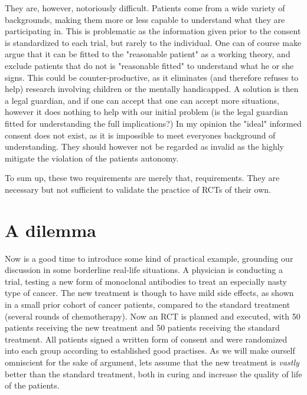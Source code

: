 \documentclass[12p]{article}
\begin{document}
They are, however, notoriously difficult.
Patients come from a wide variety of backgrounds, making them more or less capable to understand what they are participating in.
This is problematic as the information given prior to the consent is standardized to each trial, but rarely to the individual.
One can of course make argue that it can be fitted to the "reasonable patient" as a working theory, and exclude patients that do not is "reasonable fitted" to understand what he or she signs.
This could be counter-productive, as it eliminates (and therefore refuses to help) research involving children or the mentally handicapped.
A solution is then a legal guardian, and if one can accept that one can accept more situations, however it does nothing to help with our initial problem (is the legal guardian fitted for understanding the full implications?)
In my opinion the "ideal" informed consent does not exist, as it is impossible to meet everyones background of understanding.
They should however not be regarded as invalid as the highly mitigate the violation of the patients autonomy.

To sum up, these two requirements are merely that, requirements.
They are necessary but not sufficient to validate the practice of RCTs of their own.

\section*{A dilemma}

Now is a good time to introduce some kind of practical example, grounding our discussion in some borderline real-life situations.
A physician is conducting a trial, testing a new form of monoclonal antibodies to treat an especially nasty type of cancer.
The new treatment is though to have mild side effects, as shown in a small prior cohort of cancer patients, compared to the standard treatment (several rounds of chemotherapy).
Now an RCT is planned and executed, with 50 patients receiving the new treatment and 50 patients receiving the standard treatment.
All patients signed a written form of consent and were randomized into each group according to established good practises.
As we will make ourself omniscient for the sake of argument, lets assume that the new treatment is \emph{vastly} better than the standard treatment, both in curing and increase the quality of life of the patients.
\end{document}
